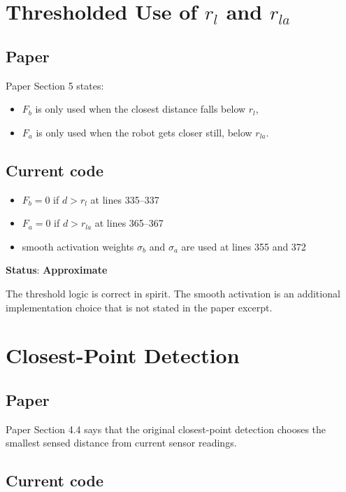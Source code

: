 \documentclass[11pt]{article}
\begin{document}
\section*{Thresholded Use of \(r_l\) and \(r_{la}\)}

\subsection*{Paper}

Paper Section 5 states:

\begin{itemize}[leftmargin=*]
  \item \(F_b\) is only used when the closest distance falls below \(r_l\),
  \item \(F_a\) is only used when the robot gets closer still, below \(r_{la}\).
\end{itemize}

\subsection*{Current code}

\begin{itemize}[leftmargin=*]
  \item \(F_b = 0\) if \(d > r_l\) at lines 335--337
  \item \(F_a = 0\) if \(d > r_{la}\) at lines 365--367
  \item smooth activation weights \(\sigma_b\) and \(\sigma_a\) are used at
  lines 355 and 372
\end{itemize}

\textbf{Status}: \textbf{Approximate}

The threshold logic is correct in spirit. The smooth activation is an additional
implementation choice that is not stated in the paper excerpt.

\section*{Closest-Point Detection}

\subsection*{Paper}

Paper Section 4.4 says that the original closest-point detection chooses the
smallest sensed distance from current sensor readings.

\subsection*{Current code}
\end{document}

